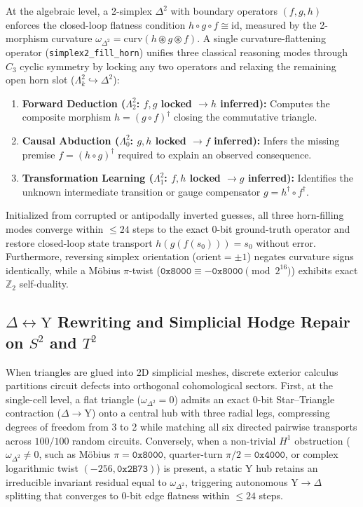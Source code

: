 \documentclass[11pt, a4paper]{article}
\begin{document}
At the algebraic level, a 2-simplex $\Delta^2$ with boundary operators $(f, g, h)$ enforces the closed-loop flatness condition $h \circ g \circ f \cong \mathrm{id}$, measured by the 2-morphism curvature $\omega_{\Delta^2} = \mathrm{curv}(h \circledast g \circledast f)$. A single curvature-flattening operator (\texttt{simplex2\_fill\_horn}) unifies three classical reasoning modes through $C_3$ cyclic symmetry by locking any two operators and relaxing the remaining open horn slot ($\Lambda^2_k \hookrightarrow \Delta^2$):
\begin{enumerate}
    \item \textbf{Forward Deduction ($\Lambda^2_2$: $f, g$ locked $\to h$ inferred):} Computes the composite morphism $h = (g \circ f)^\dagger$ closing the commutative triangle.
    \item \textbf{Causal Abduction ($\Lambda^2_0$: $g, h$ locked $\to f$ inferred):} Infers the missing premise $f = (h \circ g)^\dagger$ required to explain an observed consequence.
    \item \textbf{Transformation Learning ($\Lambda^2_1$: $f, h$ locked $\to g$ inferred):} Identifies the unknown intermediate transition or gauge compensator $g = h^\dagger \circ f^\dagger$.
\end{enumerate}
Initialized from corrupted or antipodally inverted guesses, all three horn-filling modes converge within $\le 24$ steps to the exact 0-bit ground-truth operator and restore closed-loop state transport $h(g(f(s_0))) = s_0$ without error. Furthermore, reversing simplex orientation ($\mathrm{orient} = \pm 1$) negates curvature signs identically, while a M\"{o}bius $\pi$-twist ($\texttt{0x8000} \equiv -\texttt{0x8000} \pmod{2^{16}}$) exhibits exact $\mathbb{Z}_2$ self-duality.

\subsection{$\Delta \leftrightarrow \mathrm{Y}$ Rewriting and Simplicial Hodge Repair on $S^2$ and $T^2$}
When triangles are glued into 2D simplicial meshes, discrete exterior calculus partitions circuit defects into orthogonal cohomological sectors. First, at the single-cell level, a flat triangle ($\omega_{\Delta^2} = 0$) admits an exact 0-bit Star--Triangle contraction ($\Delta \to \mathrm{Y}$) onto a central hub with three radial legs, compressing degrees of freedom from 3 to 2 while matching all six directed pairwise transports across $100/100$ random circuits. Conversely, when a non-trivial $H^1$ obstruction ($\omega_{\Delta^2} \neq 0$, such as M\"{o}bius $\pi = \texttt{0x8000}$, quarter-turn $\pi/2 = \texttt{0x4000}$, or complex logarithmic twist $(-256, \texttt{0x2B73})$) is present, a static $\mathrm{Y}$ hub retains an irreducible invariant residual equal to $\omega_{\Delta^2}$, triggering autonomous $\mathrm{Y} \to \Delta$ splitting that converges to 0-bit edge flatness within $\le 24$ steps.
\end{document}
